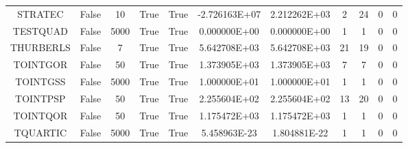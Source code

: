 \begin{longtable}{ccccccccccc}
	\cellcolor{default2} STRATEC& \cellcolor{default2} False& \cellcolor{default2} 10& \cellcolor{default2} True& \cellcolor{default2} True& \cellcolor{best} -2.726163E+07& \cellcolor{poor} 2.212262E+03& \cellcolor{best} 2& \cellcolor{poor} 24& \cellcolor{default2} 0& \cellcolor{default2} 0\\
	\cellcolor{default1} TESTQUAD& \cellcolor{default1} False& \cellcolor{default1} 5000& \cellcolor{default1} True& \cellcolor{default1} True& \cellcolor{best} 0.000000E+00& \cellcolor{best} 0.000000E+00& \cellcolor{best} 1& \cellcolor{best} 1& \cellcolor{default1} 0& \cellcolor{default1} 0\\
	\cellcolor{default2} THURBERLS& \cellcolor{default2} False& \cellcolor{default2} 7& \cellcolor{default2} True& \cellcolor{default2} True& \cellcolor{ok} 5.642708E+03& \cellcolor{best} 5.642708E+03& \cellcolor{ok} 21& \cellcolor{best} 19& \cellcolor{default2} 0& \cellcolor{default2} 0\\
	\cellcolor{default1} TOINTGOR& \cellcolor{default1} False& \cellcolor{default1} 50& \cellcolor{default1} True& \cellcolor{default1} True& \cellcolor{ok} 1.373905E+03& \cellcolor{best} 1.373905E+03& \cellcolor{best} 7& \cellcolor{best} 7& \cellcolor{default1} 0& \cellcolor{default1} 0\\
	\cellcolor{default2} TOINTGSS& \cellcolor{default2} False& \cellcolor{default2} 5000& \cellcolor{default2} True& \cellcolor{default2} True& \cellcolor{best} 1.000000E+01& \cellcolor{ok} 1.000000E+01& \cellcolor{best} 1& \cellcolor{best} 1& \cellcolor{default2} 0& \cellcolor{default2} 0\\
	\cellcolor{default1} TOINTPSP& \cellcolor{default1} False& \cellcolor{default1} 50& \cellcolor{default1} True& \cellcolor{default1} True& \cellcolor{ok} 2.255604E+02& \cellcolor{best} 2.255604E+02& \cellcolor{best} 13& \cellcolor{ok} 20& \cellcolor{default1} 0& \cellcolor{default1} 0\\
	\cellcolor{default2} TOINTQOR& \cellcolor{default2} False& \cellcolor{default2} 50& \cellcolor{default2} True& \cellcolor{default2} True& \cellcolor{ok} 1.175472E+03& \cellcolor{best} 1.175472E+03& \cellcolor{best} 1& \cellcolor{best} 1& \cellcolor{default2} 0& \cellcolor{default2} 0\\
	\cellcolor{default1} TQUARTIC& \cellcolor{default1} False& \cellcolor{default1} 5000& \cellcolor{default1} True& \cellcolor{default1} True& \cellcolor{best} 5.458963E-23& \cellcolor{ok} 1.804881E-22& \cellcolor{best} 1& \cellcolor{best} 1& \cellcolor{default1} 0& \cellcolor{default1} 0\\

\end{longtable}
